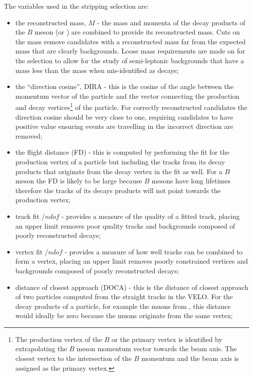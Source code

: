 The variables used in the stripping selection are:
\begin{itemize}
\item the reconstructed mass, $M$ - the mass and momenta of the decay products of the $B$ meson (or \jpsi) are combined to provide its reconstructed mass. Cuts on the mass remove candidates with a reconstructed mass far from the expected mass that are clearly backgrounds. Loose mass requirements are made on for the \bsmumu selection to allow for the study of semi-leptonic backgrounds that have a mass less than the \bs mass when mis-identified as \bsmumu decays;
\item the ``direction cosine'', DIRA - this is the cosine of the angle between the momentum vector of the particle and the vector connecting the production and decay vertices\footnote{The production vertex of the $B$ or the primary vertex is identified by extrapolating the $B$ meson momentum vector towards the beam axis. The closest vertex to the intersection of the $B$ momentum and the beam axis is assigned as the primary vertex.} of the particle. For correctly reconstructed candidates the direction cosine should be very close to one, requiring candidates to have positive value ensuring events are travelling in the incorrect direction are removed;
\item the flight distance (FD) \chisqd $ $- this is computed by performing the fit for the production vertex of a particle but including the tracks from its decay products that originate from the decay vertex in the fit as well. For a $B$ meson the FD \chisqd is likely to be large because $B$ mesons have long lifetimes therefore the tracks of its decays products will not point towards the production vertex;
\item track fit \chisqd/$ndof$ - provides a measure of the quality of a fitted track, placing an upper limit removes poor quality tracks and backgrounds composed of poorly reconstructed decays;
\item vertex fit \chisqd/$ndof$ - provides a measure of how well tracks can be combined to form a vertex, placing an upper limit removes poorly constrained vertices and backgrounds composed of poorly reconstructed decays;
\item distance of closest approach (DOCA) - this is the distance of closest approach of two particles computed from the straight tracks in the VELO. For the decay products of a particle, for example the muons from \bsmumu, this distance would ideally be zero because the muons originate from the same vertex;

\end{itemize}
